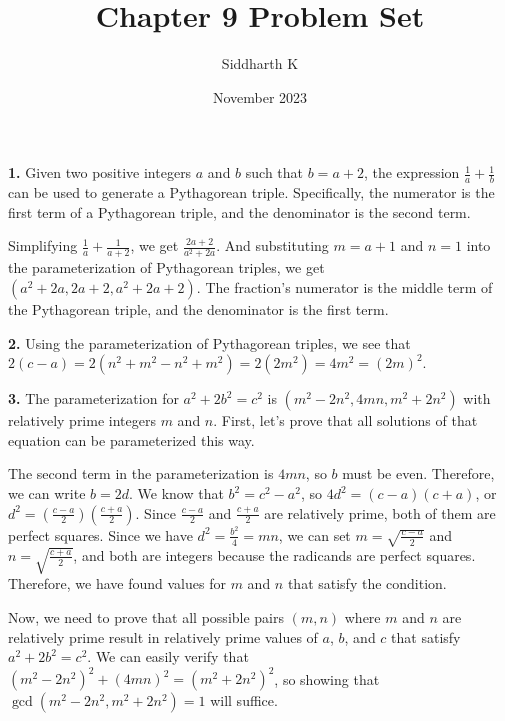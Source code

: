 \documentclass{article}
\title{Chapter 9 Problem Set}
\author{Siddharth K}
\date{November 2023}
\begin{document}
\maketitle

\textbf{1.} Given two positive integers $a$ and $b$ such that $b = a + 2$, the expression $\frac{1}{a} + \frac{1}{b}$ can be used to generate a Pythagorean triple. Specifically, the numerator is the first term of a Pythagorean triple, and the denominator is the second term.
\newline

Simplifying $\frac{1}{a} + \frac{1}{a + 2}$, we get $\frac{2a + 2}{a^2 + 2a}$. And substituting $m = a + 1$ and $n = 1$ into the parameterization of Pythagorean triples, we get $(a^2 + 2a, 2a + 2, a^2 + 2a + 2)$. The fraction's numerator is the middle term of the Pythagorean triple, and the denominator is the first term.
\newline

\textbf{2.} Using the parameterization of Pythagorean triples, we see that $2(c - a) = 2(n^2 + m^2 - n^2 + m^2) = 2(2m^2) = 4m^2 = (2m)^2$.
\newline

\textbf{3.} The parameterization for $a^2 + 2b^2 = c^2$ is $(m^2 - 2n^2, 4mn, m^2 + 2n^2)$ with relatively prime integers $m$ and $n$. First, let's prove that all solutions of that equation can be parameterized this way.
\newline

The second term in the parameterization is $4mn$, so $b$ must be even. Therefore, we can write $b = 2d$. We know that $b^2 = c^2 - a^2$, so $4d^2 = (c - a)(c + a)$, or $d^2 = \left(\frac{c - a}{2}\right)\left(\frac{c + a}{2}\right)$. Since $\frac{c - a}{2}$ and $\frac{c + a}{2}$ are relatively prime, both of them are perfect squares. Since we have $d^2 = \frac{b^2}{4} = mn$, we can set $m = \sqrt{\frac{c - a}{2}}$ and $n = \sqrt{\frac{c + a}{2}}$, and both are integers because the radicands are perfect squares. Therefore, we have found values for $m$ and $n$ that satisfy the condition.
\newline

Now, we need to prove that all possible pairs $(m, n)$ where $m$ and $n$ are relatively prime result in relatively prime values of $a$, $b$, and $c$ that satisfy $a^2 + 2b^2 = c^2$. We can easily verify that $(m^2 - 2n^2)^2 + (4mn)^2 = (m^2 + 2n^2)^2$, so showing that $\gcd(m^2 - 2n^2, m^2 + 2n^2) = 1$ will suffice.
\newline
\end{document}

